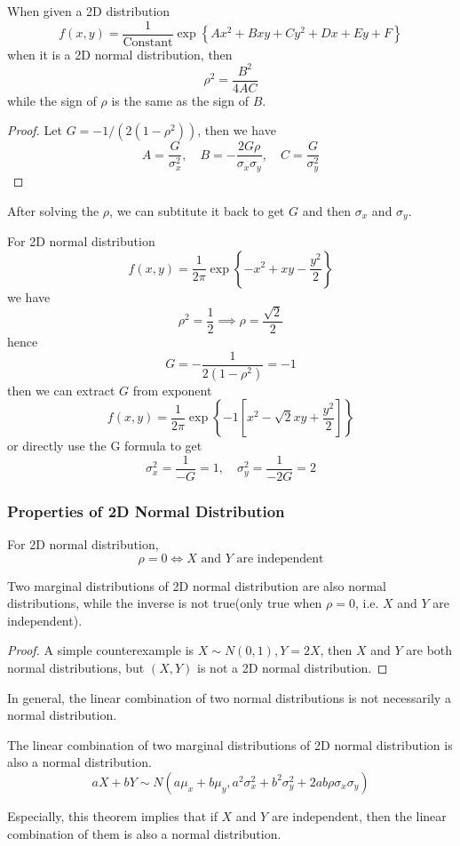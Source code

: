 \documentclass{template}
\begin{document}
\begin{theorem}
	When given a 2D distribution
	\[
		f(x, y) = \frac{1}{\text{Constant}} \exp\left\{Ax^2 + Bxy + Cy^2 + Dx + Ey + F\right\}
	\] 
	when it is a 2D normal distribution, then
	\[
		\rho^2 = \frac{B^2}{4AC}
	\] 
	while the sign of $\rho$ is the same as the sign of $B$.
	\begin{proof}
		Let $G=-1 / (2(1-\rho^2))$, then we have
		\[
			A = \frac{G}{\sigma_x^2}, \quad B = -\frac{2G\rho}{\sigma_x\sigma_y}, \quad C = \frac{G}{\sigma_y^2}
		\] 
	\end{proof}
\end{theorem}
\begin{remark}
	After solving the $\rho$, we can subtitute it back to get  $G$ and then $\sigma_x$ and $\sigma_y$.
\end{remark}

\begin{example}
	For 2D normal distribution
	\[
		f(x, y) = \frac{1}{2\pi} \exp\left\{ -x^2 + xy - \frac{y^2}{2} \right\}
	\] 
	we have
	\[
		\rho^2 = \frac{1}{2} \implies \rho = \frac{\sqrt{2}}{2}
	\] 
	hence
	\[
		G = -\frac{1}{2(1-\rho^2)} = -1
	\] 
	then we can extract $G$ from exponent
	\[
		f(x, y) = \frac{1}{2\pi} \exp\left\{ -1 \left[ x^2 - \sqrt{2}xy + \frac{y^2}{2} \right] \right\}
	\] 
	or directly use the G formula to get
	\[
		\sigma_x^2 = \frac{1}{-G} = 1, \quad \sigma_y^2 = \frac{1}{-2G} = 2
	\] 
\end{example}

\subsubsection{Properties of 2D Normal Distribution}

\begin{theorem}
	For 2D normal distribution, 
	\[
		\rho = 0 \iff X \text{ and } Y \text{ are independent}
	\] 
\end{theorem}
\begin{theorem}
Two marginal distributions of 2D normal distribution are also normal distributions,
while the inverse is not true(only true when $\rho=0$, i.e. $X$ and $Y$ are independent).
\begin{proof}
	A simple counterexample is $X\sim N(0, 1), Y=2X$, then $X$ and $Y$ are both
	normal distributions, but $(X, Y)$ is not a 2D normal distribution.
\end{proof}
\end{theorem}

In general, the linear combination of two normal distributions is not necessarily a normal distribution.
\begin{theorem}
	The linear combination of two marginal distributions of 2D normal distribution 
is also a normal distribution.
\[
aX+bY \sim N(a\mu_x+b\mu_y, a^2\sigma_x^2 + b^2\sigma_y^2 + 2ab\rho\sigma_x\sigma_y)
\] 
\end{theorem}
Especially, this theorem implies that if $X$ and $Y$ are independent, then the
linear combination of them is also a normal distribution.
\end{document}
